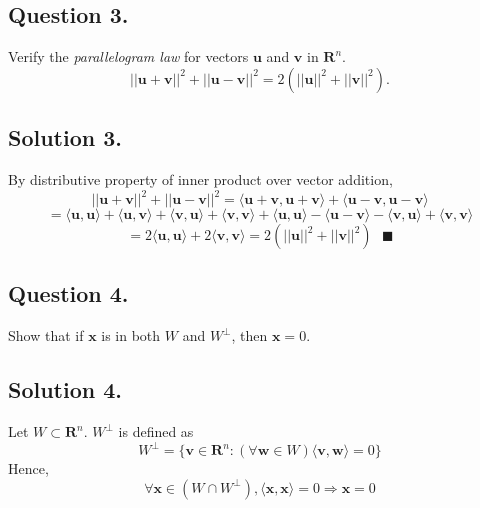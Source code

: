 \documentclass{article}
\begin{document}
\subsection*{Question 3.}
Verify the \textit{parallelogram law} for vectors $\mathbf{u}$ and $\mathbf{v}$ in $\mathbf{R}^n$.
\[||\mathbf{u}+\mathbf{v}||^2+||\mathbf{u}-\mathbf{v}||^2=2(||\mathbf{u}||^2+||\mathbf{v}||^2).\]
\subsection*{Solution 3.}
By distributive property of inner product over vector addition,
    \[||\mathbf{u}+\mathbf{v}||^2+||\mathbf{u}-\mathbf{v}||^2=\langle \mathbf{u}+\mathbf{v},\mathbf{u}+\mathbf{v}\rangle+\langle \mathbf{u}-\mathbf{v},\mathbf{u}-\mathbf{v}\rangle
    \]
    \[=\langle \mathbf{u},\mathbf{u}\rangle+\langle\mathbf{u},\mathbf{v}\rangle+\langle \mathbf{v},\mathbf{u}\rangle+\langle\mathbf{v},\mathbf{v}\rangle+\langle \mathbf{u},\mathbf{u}\rangle-\langle\mathbf{u}-\mathbf{v}\rangle-\langle \mathbf{v},\mathbf{u}\rangle+\langle\mathbf{v},\mathbf{v}\rangle\]
    \[=2\langle \mathbf{u},\mathbf{u}\rangle+2\langle \mathbf{v},\mathbf{v}\rangle
    =2(||\mathbf{u}||^2+||\mathbf{v}||^2)\text{     } \blacksquare
    \]
\subsection*{Question 4.}
Show that if $\mathbf{x}$ is in both $W$ and $W^\perp$, then $\mathbf{x}=0$.
\subsection*{Solution 4.}
Let $W\subset \mathbf{R}^n$.\newline
$W^\perp$ is defined as
\[W^\perp =\{\mathbf{v}\in\mathbf{R}^n:(\forall \mathbf{w}\in W) \langle \mathbf{v},\mathbf{w}\rangle=0\}\]
Hence, \[\forall \mathbf{x}\in (W\cap W^\perp),\langle \mathbf{x},\mathbf{x}\rangle=0\Rightarrow \mathbf{x}=0\]
\end{document}
